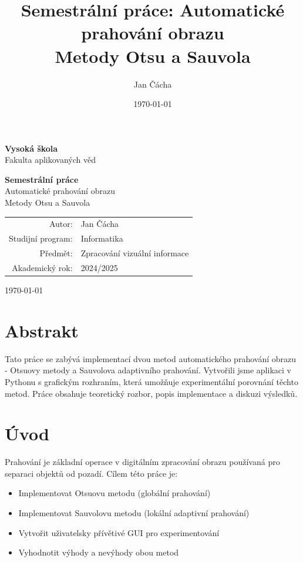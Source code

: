\documentclass[12pt,a4paper]{article}
\title{Semestrální práce: Automatické prahování obrazu \\ Metody Otsu a Sauvola}
\author{Jan Čácha}
\date{\today}
\begin{document}
\begin{titlepage}
    \centering
    {\LARGE\bfseries Vysoká škola \\[0.3cm]}
    {\Large Fakulta aplikovaných věd\\[2cm]}
    
    {\Huge\bfseries Semestrální práce\\[1cm]}
    {\LARGE Automatické prahování obrazu\\[0.5cm]}
    {\Large Metody Otsu a Sauvola\\[2cm]}
    
    \begin{tabular}{rl}
        Autor: & Jan Čácha \\
        Studijní program: & Informatika \\
        Předmět: & Zpracování vizuální informace \\
        Akademický rok: & 2024/2025 \\
    \end{tabular}
    
    \vfill
    {\large \today}
\end{titlepage}

\tableofcontents
\thispagestyle{empty}
\newpage

\setcounter{page}{1}

\section*{Abstrakt}
Tato práce se zabývá implementací dvou metod automatického prahování obrazu - Otsuovy metody a Sauvolova adaptivního prahování. Vytvořili jsme aplikaci v Pythonu s grafickým rozhraním, která umožňuje experimentální porovnání těchto metod. Práce obsahuje teoretický rozbor, popis implementace a diskuzi výsledků.

\section{Úvod}
Prahování je základní operace v digitálním zpracování obrazu používaná pro separaci objektů od pozadí. Cílem této práce je:

\begin{itemize}
\item Implementovat Otsuovu metodu (globální prahování)
\item Implementovat Sauvolovu metodu (lokální adaptivní prahování)
\item Vytvořit uživatelsky přívětivé GUI pro experimentování
\item Vyhodnotit výhody a nevýhody obou metod
\end{itemize}
\end{document}
